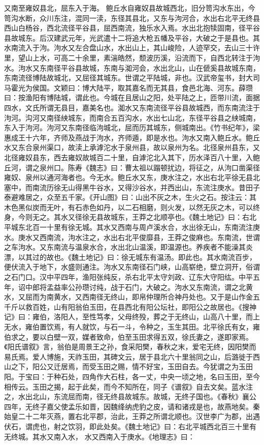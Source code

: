 \documentclass[12pt,UTF8]{ctexbook}
\begin{document}
又南至雍奴县北，屈东入于海。
鲍丘水自雍奴县故城西北，旧分笥沟水东出，今笥沟水断，众川东注，混同一渎，东径其县北，又东与泃河合，水出右北平无终县西山白杨谷，西北流径平谷县，屈西南流，独乐水入焉。水出北抱犊固南，径平谷县故城东。后汉建武元年，光武遣十二将追大枪五幡及平谷，大破之于是县也。其水南流入于泃。泃水又左合盘山水，水出山上，其山峻险，人迹罕交，去山三十许里，望山上水，可高二十余里，素湍皓然，颓波历溪，沿流而下，自西北转注于泃水。泃水又东南径平谷县故城，东南与洳河会，水出北山，山在傂奚县故城东南，东南流径博陆故城北，又屈径其城东。世谓之平陆城，非也。汉武帝玺书，封大司马霍光为侯国。文颖曰：博大陆平，取其嘉名而无其县，食邑北海、河东。薛瓒曰：按渔阳有博陆城，谓此也。今城在且居山之阳，处平陆之上，匝带川流，面据四水，文氏所谓无县目，嘉美名也。洳水又东南流径平谷县故城西，而东南流注于泃河。沟河又南径紻城东，而南合五百沟水，水出七山北，东径平谷县之紻城南，东入于泃河。泃河又东南径临泃城北，屈而历其城东，侧城南出。《竹书纪年》，梁惠成王十六年，齐师及燕战于泃水，齐师遁，即是水也。泃水又南入鲍丘水。鲍丘水又东合泉州渠口，故渎上承滹沱水于泉州县，故以泉州为名。北径泉州县东，又北径雍奴县东，西去雍奴故城百二十里，自滹沱北入其下，历水泽百八十里，入鲍丘河，谓之泉州口。陈寿《魏志》曰：曹太祖以蹋顿扰边，将征之，从泃口凿渠径雍奴、泉州以通河海者也。今无水。鲍丘水又东，庚水注之，水出右北平徐无县北塞中，而南流历徐无山得黑牛谷水，又得沙谷水，并西出山，东流注庚水。昔田子泰避难居之，众至五千家。《开山图》曰：山出不灰之木，生火之石。按注云：其木色黑似炭而无叶，有石赤色如丹，以二石相磨，则火发，以然无灰之木，可以终身，今则无之。其水又径徐无县故城东，王莽之北顺亭也。《魏土地记》曰：右北平城东北百一十里有徐无城。其水又西南与周卢溪水合，水出徐无山，东南流注庚水。庚水又西南流，泃水注之，水出右北平俊靡县，王莽之俊麻也。东南流，世谓之车泃水。又东南流与温泉水合，水出北山温溪，即温源也。养疾者不能澡其炎漂，以其过的故也。《魏土地记》曰：徐无城东有温汤。即此也。其水南流百步，便伏流入于地下，水盛则通注。泃水又东南径石门峡，山高崭绝，壁立洞开，俗谓之石门口。汉中平四年，渔阳张纯反，杀右北平太守刘政、辽东大守阳纮。中平五年，诏中郎将孟益率公孙瓒讨纯，战于石门，大破之。泃水又东南流，谓之北黄水，又屈而为南黄水，又西南径无终山，即帛仲理所合神丹处也。又于是山作金五千斤以救百姓，山有阳翁伯玉田，在县西北有阳公坛社，即阳公之故居也。《搜神记》曰：雍伯，洛阳人，至性笃孝，父母终殁，葬之于无终山，山高八十里，而上无水，雍伯置饮焉，有人就饮，与石一斗，令种之，玉生其田。北平徐氏有女，雍伯求之，要以白壁一双，媒者致命，伯至玉田求得五双，徐氏妻之，遂即家焉。《阳氏谱叙》言，翁伯是周景王之孙，食采阳樊，春秋之末，爱宅无终，因阳樊而易氏焉。爱人博施，天祚玉田，其碑文云，居于县北六十里翁同之山，后潞徙于西山之下，阳公又迁居焉，而受玉田之赐，情不好宝，玉田自去。今犹谓之为玉田阳。于宝曰：于种石处，四角作大石柱，各一丈，中央一顷之地，名曰玉田，至今相传云。玉田之揭，起于此矣，而今不知所在，同子《谱叙》自去文矣。蓝水注之，水出北山，东流屈而南，径无终县故城东。故城，无终子国也。《春秋》襄公四年，无终子嘉父使孟乐如晋，因魏绛纳虎豹之皮，请和诸戎是也，故燕地矣。秦始皇二十二年灭燕，置右北平郡，治此，王莽之所谓北顺也。汉世李广为郡，出遇伏石，谓虎也，射之饮羽，即此处矣。《魏土地记》曰：右北平城西北百三十里有无终城。其水又南入水， 水又西南入于庚水。《地理志》曰： 
\end{document}
